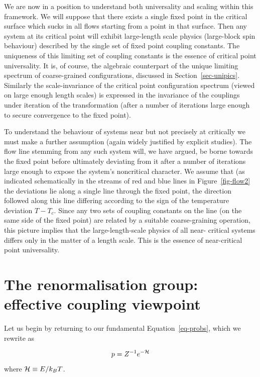 \documentclass[
  letterpaper,
  enabledeprecatedfontcommands]{report}
\begin{document}
\begin{tcolorbox}
We are now in a position to understand both universality and scaling
within this framework. We will suppose that there exists a single fixed
point in the critical surface which sucks in all flows starting from a
point in that surface. Then any system at its critical point will
exhibit large-length scale physics (large-block spin behaviour)
described by the single set of fixed point coupling constants. The
uniqueness of this limiting set of coupling constants is the essence of
critical point universality. It is, of course, the algebraic counterpart
of the unique limiting spectrum of coarse-grained configurations,
discussed in Section~\ref{sec-unipics}. Similarly the scale-invariance
of the critical point configuration spectrum (viewed on large enough
length scales) is expressed in the invariance of the couplings under
iteration of the transformation (after a number of iterations large
enough to secure convergence to the fixed point).

To understand the behaviour of systems near but not precisely at
critically we must make a further assumption (again widely justified by
explicit studies). The flow line stemming from any such system will, we
have argued, be borne towards the fixed point before ultimately
deviating from it after a number of iterations large enough to expose
the system's noncritical character. We assume that (as indicated
schematically in the streams of red and blue lines in
Figure~\ref{fig-flow2} the deviations lie along a single line through
the fixed point, the direction followed along this line differing
according to the sign of the temperature deviation \(T-T_c\). Since any
two sets of coupling constants on the line (on the same side of the
fixed point) are related by a suitable coarse-graining operation, this
picture implies that the large-length-scale physics of all near-
critical systems differs only in the matter of a length scale. This is
the essence of near-critical point universality.

\end{tcolorbox}

\chapter{The renormalisation group: effective coupling
viewpoint}\label{the-renormalisation-group-effective-coupling-viewpoint}

Let us begin by returning to our fundamental Equation~\ref{eq-probs},
which we rewrite as

\[p = Z^{-1}e^{-{\cal H}}\] where \({\cal H}\equiv E/k_BT\).
\end{document}
